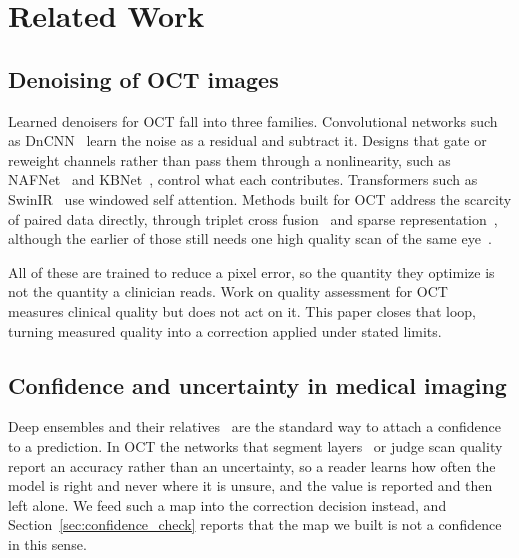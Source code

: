 \section{Related Work}
\label{sec:related}

\subsection{Denoising of OCT images}
Learned denoisers for OCT fall into three families. Convolutional networks such as
DnCNN~\cite{zhang2017beyond} learn the noise as a residual and subtract it. Designs that gate or
reweight channels rather than pass them through a nonlinearity, such as NAFNet~\cite{chen2022simple}
and KBNet~\cite{zhang2023kbnet}, control what each contributes. Transformers such as
SwinIR~\cite{liang2021swinir} use windowed self attention. Methods built for OCT address the scarcity of paired data directly, through triplet cross
fusion~\cite{geng2022triplet} and sparse representation~\cite{fang2013fast}, although the earlier of
those still needs one high quality scan of the same eye~\cite{fang2012sparsity}.

All of these are trained to reduce a pixel error, so the quantity they optimize is not the quantity a
clinician reads. Work on quality assessment for OCT~\cite{wang2019quality} measures clinical quality
but does not act on it. This paper closes that loop, turning measured quality into a correction
applied under stated limits.

\subsection{Confidence and uncertainty in medical imaging}
Deep ensembles and their relatives~\cite{lakshminarayanan2017simple} are the standard way to attach
a confidence to a prediction. In OCT the networks that segment layers~\cite{devalla2018drunet} or
judge scan quality~\cite{wang2019quality} report an accuracy rather than an uncertainty, so a reader
learns how often the model is right and never where it is unsure, and the value is reported and then
left alone. We feed such a map into the correction decision instead, and
Section~\ref{sec:confidence_check} reports that the map we built is not a confidence in this sense.

